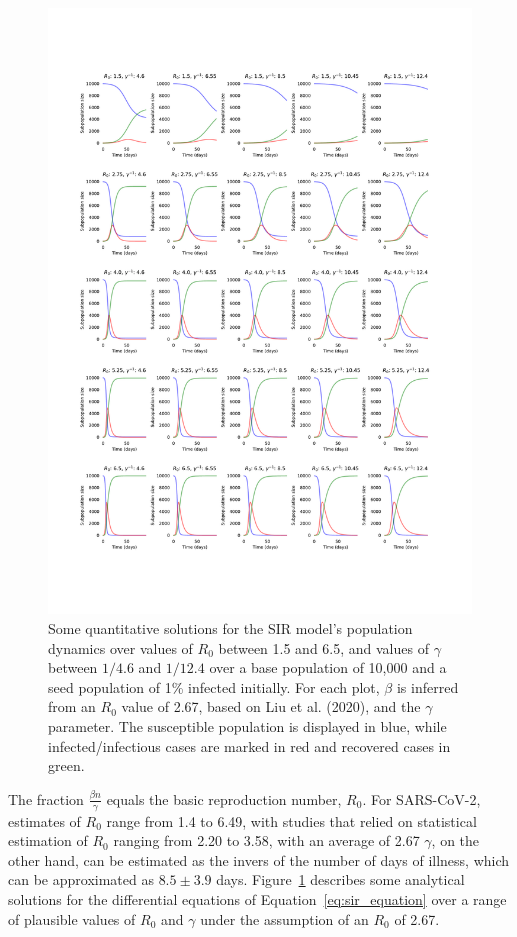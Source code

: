 \documentclass{article}
\begin{document}
\begin{figure}
	\includegraphics[width=\linewidth]{figures/fig1-odes}
	\caption{Some quantitative solutions for the SIR model's population dynamics over values of $R_0$ between 1.5 and 6.5, and values of $\gamma$ between $1/4.6$ and $1/12.4$ over a base population of 10,000 and a seed population of 1\% infected initially. For each plot, $\beta$ is inferred from an $R_0$ value of 2.67, based on Liu et al. (2020),\cite{liu2020reproductive} and the $\gamma$ parameter. The susceptible population is displayed in blue, while infected/infectious cases are marked in red and recovered cases in green.}
	\label{fig:ode_solutions}
\end{figure}

The fraction $\frac{\beta n}{\gamma}$ equals the basic reproduction number, $R_0$. For SARS-CoV-2, estimates of $R_0$ range from 1.4 to 6.49, with studies that relied on statistical estimation of $R_0$ ranging from 2.20 to 3.58, with an average of 2.67\cite{liu2020reproductive} $\gamma$, on the other hand, can be estimated as the invers of the number of days of illness, which can be approximated as $8.5 \pm 3.9$ days.\cite{pan2020clinical,liu2020risk} Figure~\ref{fig:ode_solutions} describes some analytical solutions for the differential equations of Equation~\eqref{eq:sir_equation} over a range of plausible values of $R_0$ and $\gamma$ under the assumption of an $R_0$ of 2.67.
\end{document}
